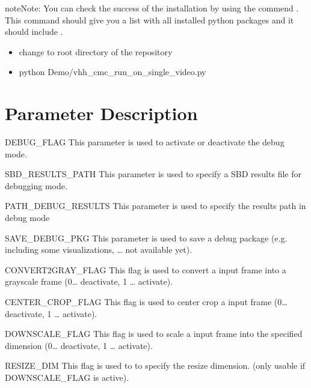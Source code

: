 \documentclass[letterpaper,10pt,english,openany,oneside]{sphinxmanual}
\begin{document}
\begin{sphinxadmonition}{note}{Note:}
You can check the success of the installation by using the commend . This command should give you a list
with all installed python packages and it should include .
\end{sphinxadmonition}

\begin{itemize}
\item {} 
change to root directory of the repository

\item {} 
python Demo/vhh\_cmc\_run\_on\_single\_video.py

\end{itemize}


\chapter{Parameter Description}
\label{\detokenize{index:parameter-description}}
DEBUG\_FLAG
This parameter is used to activate or deactivate the debug mode.



SBD\_RESULTS\_PATH
This parameter is used to specify a SBD results file for debugging mode.



PATH\_DEBUG\_RESULTS
This parameter is used to specify the results path in debug mode



SAVE\_DEBUG\_PKG
This parameter is used to save a debug package (e.g. including some visualizations, … \sphinxhyphen{} not available yet).



CONVERT2GRAY\_FLAG
This flag is used to convert a input frame into a grayscale frame (0… deactivate, 1 … activate).



CENTER\_CROP\_FLAG
This flag is used to center crop a input frame (0… deactivate, 1 … activate).



DOWNSCALE\_FLAG
This flag is used to scale a input frame into the specified dimension (0… deactivate, 1 … activate).



RESIZE\_DIM
This flag is used to to specify the resize dimension. (only usable if DOWNSCALE\_FLAG is active).
\end{document}
